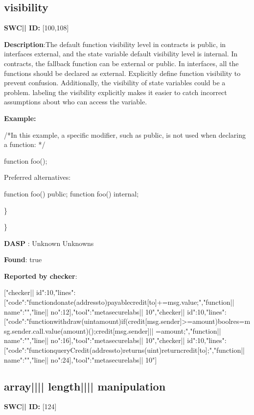 \documentclass{article}
\begin{document}
\subsection{visibility} 
\textbf{SWC{|\textunderscore| }ID:} [100,108]

\textbf{Description}:The default function visibility level in contracts is public, in interfaces {\textendash} external,  and the state variable default visibility level is internal. In contracts, the fallback function can be external or public. In interfaces, all the functions should be declared as external. Explicitly define function visibility to prevent confusion.
Additionally, the visibility of state variables could be a problem. labeling the visibility explicitly makes it easier to catch incorrect assumptions about who can access the variable.


\textbf{Example:} 
\begin{ffcode} 

/*In this example, a specific modifier, such as public, is not used when declaring a function: */ 

function foo();

Preferred alternatives:

function foo() public;
function foo() internal;

\end{ffcode} 
\} 

\} 

\textbf{DASP} : Unknown Unknowns

\textbf{Found}: true

\textbf{Reported by checker}: 
\begin{ffcode} 

[{"checker|\textunderscore| id":10,"lines":[{"code":"functiondonate(addressto)payable{credit[to]+=msg.value;}","function|\textunderscore| name":"","line|\textunderscore| no":12}],"tool":"metasecurelabs|\textendash| 10"},{"checker|\textunderscore| id":10,"lines":[{"code":"functionwithdraw(uintamount){if(credit[msg.sender]>=amount){boolres=msg.sender.call.value(amount)();credit[msg.sender]|\textendash| =amount;}}","function|\textunderscore| name":"","line|\textunderscore| no":16}],"tool":"metasecurelabs|\textendash| 10"},{"checker|\textunderscore| id":10,"lines":[{"code":"functionqueryCredit(addressto)returns(uint){returncredit[to];}","function|\textunderscore| name":"","line|\textunderscore| no":24}],"tool":"metasecurelabs|\textendash| 10"}]
\end{ffcode} 
\subsection{array{||\textunderscore|| }length{||\textunderscore|| }manipulation} 
\textbf{SWC{|\textunderscore| }ID:} [124]
\end{document}
